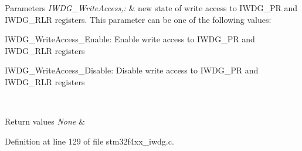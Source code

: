 \begin{DoxyParams}{Parameters}
{\em I\-W\-D\-G\-\_\-\-Write\-Access,\-:} & new state of write access to I\-W\-D\-G\-\_\-\-P\-R and I\-W\-D\-G\-\_\-\-R\-L\-R registers. This parameter can be one of the following values\-: \begin{DoxyItemize}
\item I\-W\-D\-G\-\_\-\-Write\-Access\-\_\-\-Enable\-: Enable write access to I\-W\-D\-G\-\_\-\-P\-R and I\-W\-D\-G\-\_\-\-R\-L\-R registers \item I\-W\-D\-G\-\_\-\-Write\-Access\-\_\-\-Disable\-: Disable write access to I\-W\-D\-G\-\_\-\-P\-R and I\-W\-D\-G\-\_\-\-R\-L\-R registers \end{DoxyItemize}
\\
\hline
\end{DoxyParams}

\begin{DoxyRetVals}{Return values}
{\em None} & \\
\hline
\end{DoxyRetVals}


Definition at line 129 of file stm32f4xx\-\_\-iwdg.\-c.

